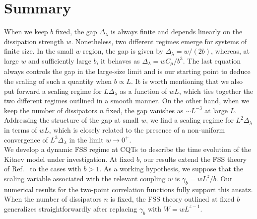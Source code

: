 \section{Summary}

When we keep $b$ fixed, the gap $\Delta_\lambda$ is always finite and depends linearly on the dissipation strength $w$. Nonetheless, two different regimes emerge for systems of finite size. In the small $w$ region, the gap is given by $\Delta_\lambda=w/(2b)$, whereas, at large $w$ and sufficiently large $b$, it behaves as $\Delta_\lambda=w C_\mu/b^3$. The last equation always controls the gap in the large-size limit and is our starting point to deduce the scaling of such a quantity when $b\propto L$. It is worth mentioning that we also put forward a scaling regime for $L\Delta_\lambda$ as a function of $wL$, which ties together the two different regimes outlined in a smooth manner. On the other hand, when we keep the number of dissipators $n$ fixed, the gap vanishes as $\sim L^{-3}$ at large $L$. Addressing the structure of the gap at small $w$, we find a scaling regime for $L^2\Delta_\lambda$ in terms of $wL$, which is closely related to the presence of a non-uniform convergence of $L^3\Delta_\lambda$ in the limit $w\to0^+$.\\

We develop a dynamic FSS regime at CQTs to describe the time evolution of the Kitaev model under investigation. At fixed $b$, our results extend the FSS theory of Ref.~\cite{NRV-2019-competingdissipativeandcoherent} to the cases with $b>1$. As a working hypothesis, we suppose that the scaling variable associated with the relevant coupling $w$ is $\gamma_b=wL^{z}/b$. Our numerical results for the two-point correlation functions fully support this ansatz. When the number of dissipators $n$ is fixed, the FSS theory outlined at fixed $b$ generalizes straightforwardly after replacing $\gamma_b$ with $W=wL^{z-1}$. 



